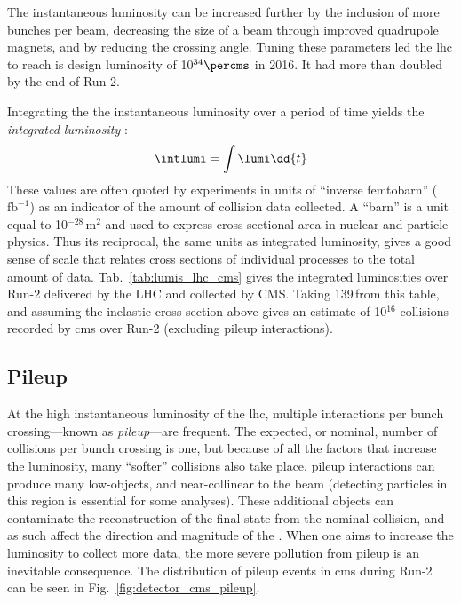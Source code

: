 The instantaneous luminosity can be increased further by the inclusion of more bunches per beam, decreasing the size of a beam through improved quadrupole magnets, and by reducing the crossing angle. Tuning these parameters led the \acrshort{lhc} to reach is design luminosity of 10$^{34}\percms$ in 2016. It had more than doubled by the end of Run-2.

Integrating the the instantaneous luminosity over a period of time yields the \emph{integrated luminosity} \intlumi:
\begin{equation}
    \intlumi = \int \lumi \dd{t}
    \label{eq:lumi_integrated}
\end{equation}
These values are often quoted by experiments in units of ``inverse femtobarn'' ($\text{fb}^{-1}$) as an indicator of the amount of collision data collected. A ``barn'' is a unit equal to 10$^{-28}$\,m$^2$ and used to express cross sectional area in nuclear and particle physics. Thus its reciprocal, the same units as integrated luminosity, gives a good sense of scale that relates cross sections of individual processes to the total amount of data. Tab.~\ref{tab:lumis_lhc_cms} gives the integrated luminosities over Run-2 delivered by the LHC and collected by CMS. Taking 139\,\fbinv from this table, and assuming the inelastic \pp cross section above gives an estimate of 10$^{16}$ collisions recorded by \acrshort{cms} over Run-2 (excluding \gls{pileup} interactions).




\subsection{Pileup}
\label{subsec:pileup}

At the high instantaneous luminosity of the \acrshort{lhc}, multiple interactions per bunch crossing---known as \emph{\gls{pileup}}---are frequent. The expected, or nominal, number of collisions per bunch crossing is one, but because of all the factors that increase the luminosity, many ``softer'' collisions also take place. \Gls{pileup} interactions can produce many low-\pt objects, and near-collinear to the beam (detecting particles in this region is essential for some analyses). These additional objects can contaminate the reconstruction of the final state from the nominal collision, and as such affect the direction and magnitude of the \ptvecmiss. When one aims to increase the luminosity to collect more data, the more severe pollution from \gls{pileup} is an inevitable consequence. The distribution of \gls{pileup} events in \acrshort{cms} during Run-2 can be seen in Fig.~\ref{fig:detector_cms_pileup}.

